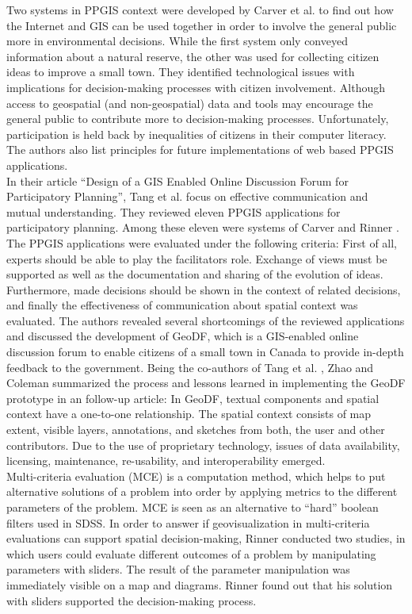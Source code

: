 Two systems in PPGIS context were developed by Carver et al. \cite{Carver2001_PPGIS_Cyberdemocracy} to find out how the Internet and GIS can be used together in order to involve the general public more in environmental decisions. While the first system only conveyed information about a natural reserve, the other was used for collecting citizen ideas to improve a small town. They identified technological issues with implications for decision-making processes with citizen involvement. Although access to geospatial (and non-geospatial) data and tools may encourage the general public to contribute more to decision-making processes.  Unfortunately, participation is held back by inequalities of citizens in their computer literacy. The authors also list principles for future implementations of web based PPGIS applications.\\
In their article ``Design of a GIS Enabled Online Discussion Forum for Participatory Planning'', Tang et al. \cite{Tang2005_PPGIS_discussion_forum} focus on effective communication and mutual understanding. They reviewed eleven PPGIS applications for participatory planning. Among these eleven were systems of Carver \cite{Carver2001_PPGIS_Cyberdemocracy} and Rinner \cite{Rinner_ArgumentationMaps,Kessler2005_ArgumentationMapPrototype}. The PPGIS applications were evaluated under the following criteria: First of all, experts should be able to play the facilitators role. Exchange of views must be supported as well as the documentation and sharing of the evolution of ideas. Furthermore, made decisions should be shown in the context of related decisions, and finally the effectiveness of communication about spatial context was evaluated. The authors revealed several shortcomings of the reviewed applications and discussed the development of GeoDF, which is a GIS-enabled online discussion forum to enable citizens of a small town in Canada to provide in-depth feedback to the government. Being the co-authors of Tang et al. \cite{Tang2005_PPGIS_discussion_forum}, Zhao and Coleman \cite{zhao2006geodf} summarized the process and lessons learned in implementing the GeoDF prototype in an follow-up article: In GeoDF, textual components and spatial context have a one-to-one relationship. The spatial context consists of map extent, visible layers, annotations, and sketches from both, the user and other contributors. Due to the use of proprietary technology, issues of data availability, licensing, maintenance, re-usability, and interoperability emerged.\\
Multi-criteria evaluation (MCE) is a computation method, which helps to put alternative solutions of a problem into order by applying metrics to the different parameters of the problem. MCE is seen as an alternative to ``hard'' boolean filters used in SDSS. In order to answer if geovisualization in multi-criteria evaluations can support spatial decision-making, Rinner \cite{Rinner2007_geovis_decisionsupport} conducted two studies, in which users could evaluate different outcomes of a problem by manipulating parameters with sliders. The result of the parameter manipulation was immediately visible on a map and diagrams. Rinner found out that his solution with sliders supported the decision-making process.\\
